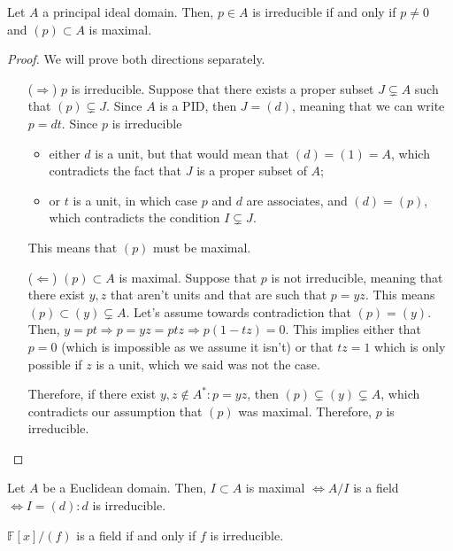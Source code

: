 \begin{theorem}
  Let $A$ a principal ideal domain. Then, $p \in A$ is irreducible if and only if $p \neq 0$ and $(p) \subset A$ is maximal.
\end{theorem}
\begin{proof}
  We will prove both directions separately. 
  \begin{itemize}
    \item[($\Rightarrow$)] $p$ is irreducible. Suppose that there exists a proper subset $J \subsetneq A$ such that $(p) \subsetneq J$. Since $A$ is a PID, then $J = (d)$, meaning that we can write $p = dt$. Since $p$ is irreducible
    \begin{itemize}
      \item either $d$ is a unit, but that would mean that $(d) = (1) = A$, which contradicts the fact that $J$ is a proper subset of $A$; 
      \item or $t$ is a unit, in which case $p$ and $d$ are associates, and $(d) = (p)$, which contradicts the condition $I \subsetneq J$.
    \end{itemize}
    This means that $(p)$ must be maximal. 
    \item[($\Leftarrow$)] $(p) \subset A$ is maximal. Suppose that $p$ is not irreducible, meaning that there exist $y, z$ that aren't units and that are such that $p = yz$. This means $(p) \subset (y) \subsetneq A$. Let's assume towards contradiction that $(p) = (y)$. Then, $y = pt \Rightarrow p = yz = ptz \Rightarrow p(1 - tz) = 0$. This implies either that $p = 0$ (which is impossible as we assume it isn't) or that $tz = 1$ which is only possible if $z$ is a unit, which we said was not the case. 

    Therefore, if there exist $y, z \notin A^*: p = yz$, then $(p) \subsetneq (y) \subsetneq A$, which contradicts our assumption that $(p)$ was maximal. Therefore, $p$ is irreducible.
  \end{itemize}
\end{proof}

\begin{theorem}
  Let $A$ be a Euclidean domain. Then, $I \subset A$ is maximal $\Leftrightarrow A/I$ is a field $\Leftrightarrow I = (d): d$ is irreducible. 
\end{theorem}
\begin{corollary}
  $\mathbb{F}[x]/(f)$ is a field if and only if $f$ is irreducible. 
\end{corollary}
